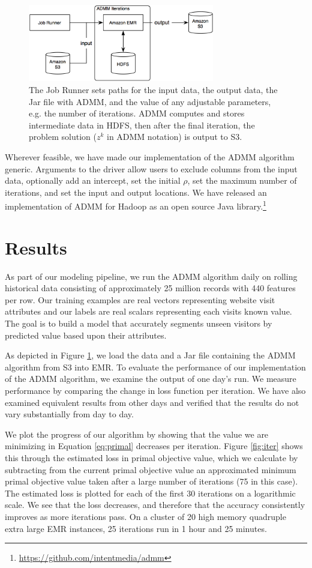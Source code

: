 \documentclass[10pt, conference, compsocconf]{IEEEtran}
\begin{document}
\begin{figure}[!t]
\centering
\includegraphics[width=3.2in]{aws_implementation}
\caption{The Job Runner sets paths for the input data, the output data, the Jar file with ADMM, and the value of any adjustable parameters, e.g. the number of iterations.  ADMM computes and stores intermediate data in HDFS, then after the final iteration, the problem solution ($z^k$ in ADMM notation) is output to S3.}
\label{fig:workflow}
\end{figure}

Wherever feasible, we have made our implementation of the ADMM algorithm generic.  Arguments to the driver allow users to exclude columns from the input data, optionally add an intercept, set the initial $\rho$, set the maximum number of iterations, and set the input and output locations. We have released an implementation of ADMM for Hadoop as an open source Java library.\footnote{\url{https://github.com/intentmedia/admm}}

\section{Results}\label{sec:results}
As part of our modeling pipeline, we run the ADMM algorithm daily on rolling historical data consisting of approximately 25 million records with 440 features per row.  Our training examples are real vectors representing website visit attributes and our labels are real scalars representing each visits known value.  The goal is to build a model that accurately segments unseen visitors by predicted value based upon their attributes.

As depicted in Figure \ref{fig:workflow}, we load the data and a Jar file containing the ADMM algorithm from S3 into EMR.  To evaluate the performance of our implementation of the ADMM algorithm, we examine the output of one day's run.  We measure performance by comparing the change in loss function per iteration.  We have also examined equivalent results from other days and verified that the results do not vary substantially from day to day.

We plot the progress of our algorithm by showing that the value we are minimizing in Equation \ref{eq:primal} decreases per iteration.  Figure \ref{fig:iter} shows this through the estimated loss in primal objective value, which we calculate by subtracting from the current primal objective value an approximated minimum primal objective value taken after a large number of iterations (75 in this case).   The estimated loss is plotted for each of the first 30 iterations on a logarithmic scale.  We see that the loss decreases, and therefore that the accuracy consistently improves as more iterations pass.  On a cluster of 20 high memory quadruple extra large EMR instances, 25 iterations run in 1 hour and 25 minutes.
\end{document}

